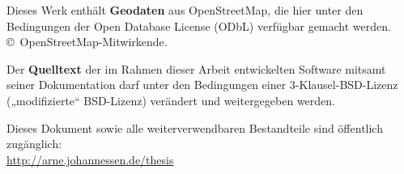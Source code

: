 {{\begin{description}[labelwidth=3.5em,leftmargin=4em,itemsep=1.5ex]
\item[\ccAttribution\kern0.1em\ccShareAlike~\footnotesize\textsf{ODbL}]
Dieses Werk enthält \textbf{Geodaten} aus OpenStreetMap, die hier unter den
Bedingungen der Open Database License (ODbL)  verfügbar
gemacht werden. \copyright~OpenStreetMap-Mitwirkende.

\item[\ccAttribution~\footnotesize\textsf{BSD}]
Der \textbf{Quelltext} der im Rahmen dieser Arbeit entwickelten Software
mitsamt seiner Dokumentation darf unter den Bedingungen einer
3-Klausel-BSD-Lizenz („modifizierte“ BSD-Lizenz) verändert und weitergegeben
werden.

\end{description}


\noindent Dieses Dokument sowie alle weiterverwendbaren Bestandteile sind öffentlich zugänglich:\\
\url{http://arne.johannessen.de/thesis}



}\clearpage
}
